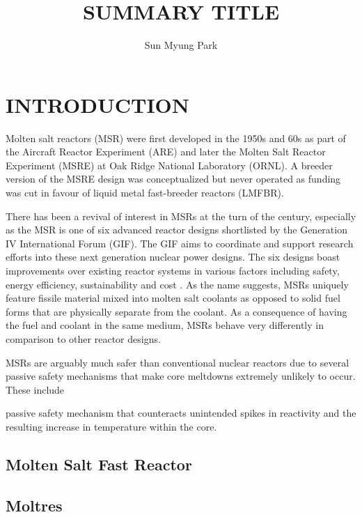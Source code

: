 \documentclass[letterpaper]{mandc2019}
\begin{document}
\title{SUMMARY TITLE}
\author{Sun Myung Park}

\maketitle
\justify

\section{INTRODUCTION}

Molten salt reactors (MSR) were first developed in the 1950s and 60s as part of the Aircraft Reactor Experiment (ARE) and later the Molten Salt Reactor Experiment (MSRE) at Oak Ridge National Laboratory (ORNL). A breeder version of the MSRE design was conceptualized but never operated as funding was cut in favour of liquid metal fast-breeder reactors (LMFBR).

There has been a revival of interest in MSRs at the turn of the century, especially as the MSR is one of six advanced reactor designs shortlisted by the Generation IV International Forum (GIF). The GIF aims to coordinate and support research efforts into these next generation nuclear power designs. The six designs boast improvements over existing reactor systems in various factors including safety, energy efficiency, sustainability and cost \cite{doe_technology_2002}. As the name suggests, MSRs uniquely feature fissile material mixed into molten salt coolants as opposed to solid fuel forms that are physically separate from the coolant. As a consequence of having the fuel and coolant in the same medium, MSRs behave very differently in comparison to other reactor designs.

MSRs are arguably much safer than conventional nuclear reactors due to several passive safety mechanisms that make core meltdowns extremely unlikely to occur. These include 

 passive safety mechanism that counteracts unintended spikes in reactivity and the resulting increase in temperature within the core.

\subsection{Molten Salt Fast Reactor}



\subsection{Moltres}
\end{document}
